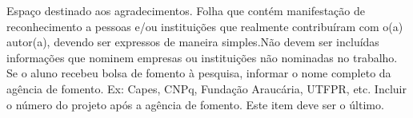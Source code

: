 \begin{Acknowledgments}%
Espaço destinado aos agradecimentos. Folha que contém manifestação de reconhecimento a pessoas e/ou instituições que realmente contribuíram com o(a) autor(a), devendo ser expressos de maneira simples.Não devem ser incluídas informações que nominem empresas ou instituições não nominadas no trabalho. Se o aluno recebeu bolsa de fomento à pesquisa, informar o nome completo da agência de fomento. Ex: Capes, CNPq, Fundação Araucária, UTFPR, etc. Incluir o número do projeto após a agência de fomento. Este item deve ser o último.

\end{Acknowledgments}